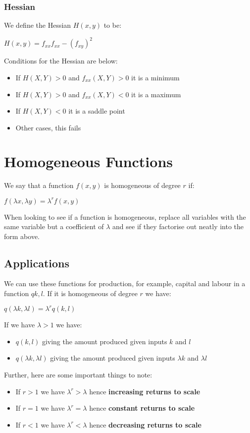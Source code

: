 \documentclass[12pt, letterpaper]{article}
\begin{document}
\subsubsection{Hessian}
We define the Hessian $H(x,y)$ to be:
\begin{center}
	$H(x,y) = f_{xx}f_{xx}-(f_{xy})^2$
\end{center}
Conditions for the Hessian are below:
\begin{itemize}
	\item If $H(X,Y) > 0$ and $f_{xx}(X,Y) > 0$ it is a minimum
	\item If $H(X,Y) > 0$ and $f_{xx}(X, Y) < 0$ it is a maximum
	\item If $H(X,Y) < 0$ it is a saddle point
	\item Other cases, this fails
\end{itemize}


\newpage
\section{Homogeneous Functions}
We say that a function $f(x, y)$ is homogeneous of degree $r$ if:
\begin{center}
	$f(\lambda x, \lambda y ) = \lambda^rf(x, y)$
\end{center}
When looking to see if a function is homogeneous, replace all variables with the same variable but a coefficient of $\lambda$ and see if they factorise out neatly into the form above.

\subsection{Applications}
We can use these functions for production, for example, capital and labour in a function $q{k,l}$. If it is homogeneous of degree $r$ we have:
\begin{center}
	$q(\lambda k, \lambda l) = \lambda^r q(k,l)$
\end{center}
If we have $\lambda > 1$ we have:
\begin{itemize}
	\item $q(k,l)$ giving the amount produced given inputs $k$ and $l$
	\item $q(\lambda k, \lambda l)$ giving the amount produced given inputs $\lambda k$ and $\lambda l$
\end{itemize}
Further, here are some important things to note:
\begin{itemize}
	\item If $r>1$ we have $\lambda^r > \lambda$ hence \textbf{increasing returns to scale}
	\item If $r=1$ we have $\lambda^r = \lambda$ hence \textbf{constant returns to scale}
	\item If $r<1$ we have $\lambda^r < \lambda$ hence \textbf{decreasing returns to scale}
\end{itemize}
\end{document}

